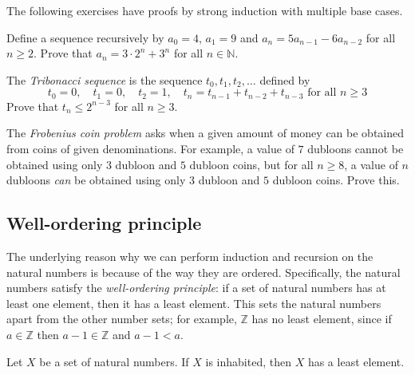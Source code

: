 The following exercises have proofs by strong induction with multiple base cases.

\begin{exercise}
Define a sequence recursively by $a_0 = 4$, $a_1 = 9$ and $a_n = 5a_{n-1} - 6a_{n-2}$ for all $n \ge 2$. Prove that $a_n = 3 \cdot 2^n + 3^n$ for all $n \in \mathbb{N}$.
\end{exercise}

\begin{exercise}
The \textit{Tribonacci sequence} is the sequence $t_0, t_1, t_2, \dots$ defined by
\[ t_0 = 0, \quad t_1 = 0, \quad t_2 = 1, \quad t_n = t_{n-1} + t_{n-2} + t_{n-3} \text{ for all } n \ge 3 \]
Prove that $t_n \le 2^{n-3}$ for all $n \ge 3$.
\end{exercise}

\begin{exercise}
The \textit{Frobenius coin problem} asks when a given amount of money can be obtained from coins of given denominations. For example, a value of $7$ dubloons cannot be obtained using only $3$ dubloon and $5$ dubloon coins, but for all $n \ge 8$, a value of $n$ dubloons \textit{can} be obtained using only $3$ dubloon and $5$ dubloon coins. Prove this.
\end{exercise}

\subsection*{Well-ordering principle}

The underlying reason why we can perform induction and recursion on the natural numbers is because of the way they are ordered. Specifically, the natural numbers satisfy the \textit{well-ordering principle}: if a set of natural numbers has at least one element, then it has a least element. This sets the natural numbers apart from the other number sets; for example, $\mathbb{Z}$ has no least element, since if $a \in \mathbb{Z}$ then $a-1 \in \mathbb{Z}$ and $a-1 < a$.

\begin{theorem}
\label{thmWellOrderingPrinciple}
Let $X$ be a set of natural numbers. If $X$ is inhabited, then $X$ has a least element.
\end{theorem}

